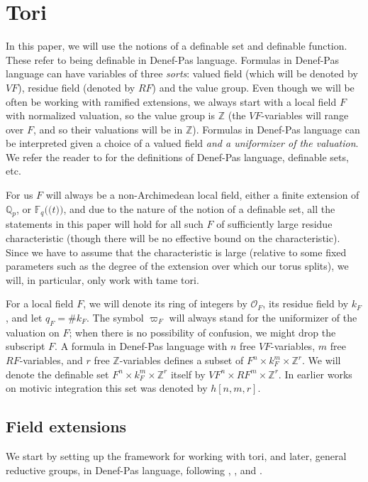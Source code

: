 \documentclass{amsart}
\newcommand{\Q}{{\mathbb Q}}
\newcommand{\F}{{\mathbb F}}
\newcommand{\Z}{{\mathbb Z}}
\newcommand{\ri}{\mathcal{O}}
\def\llp{\mathopen{(\!(}}
\def\rrp{\mathopen{)\!)}}
\theoremstyle{plain}
\theoremstyle{definition}
\begin{document}
\section{Tori} 
In this paper, we will use the notions of a definable set and  definable function. These refer to being definable in Denef-Pas language. 
Formulas in Denef-Pas language can have variables of three \emph{sorts}: valued field (which will be denoted by $VF$), residue field (denoted by $RF$) and the value group. Even though we will be often be working with ramified extensions, we always start with a local field $F$ with normalized valuation, so the value group is $\Z$ (the $VF$-variables will range over $F$, and so their valuations will be in $\Z$).
Formulas in Denef-Pas language can be interpreted given a choice of a valued field \emph{and a uniformizer of the valuation}. 
We refer the reader to \cite{what's the best ref?} for the definitions of Denef-Pas language, definable sets, etc. 

For us $F$ will always be a non-Archimedean local field, either a finite extension of $\Q_p$, or 
$\F_q\llp t\rrp$, and due to the nature of the notion of a definable set,  all the statements in this paper will hold for all such $F$ of sufficiently large residue characteristic 
(though there will be no effective bound on the characteristic). Since we have to assume that the characteristic is large (relative to some fixed parameters such as the degree of the extension over which our torus splits), we will, in particular, only work with tame tori.  

For a local field $F$, we will denote its ring of integers by $\ri_F$,  its residue field by $k_F$, and let $q_F=\# k_F$. The symbol $\varpi_F$ will always stand for the uniformizer of the valuation on $F$; when there is no possibility of confusion, we might drop the subscript $F$. 
A formula in Denef-Pas language  with $n$ free $VF$-variables, $m$ free $RF$-variables, and $r$ free 
$\Z$-variables 
defines a subset of $F^n\times k_F^m \times \Z^r$. 
We will denote the definable set $F^n\times k_F^m \times \Z^r$ itself by $VF^n\times RF^m\times \Z^r$. In earlier works on motivic integration this set was denoted by $h[n,m,r]$. 

\subsection{Field extensions}
We start by setting up the framework for working with tori, and later, general reductive groups, in Denef-Pas language, following \cite{cluckers-hales-loeser}, \cite{CGH-2}, and \cite{hales:transfert}. 
\end{document}

